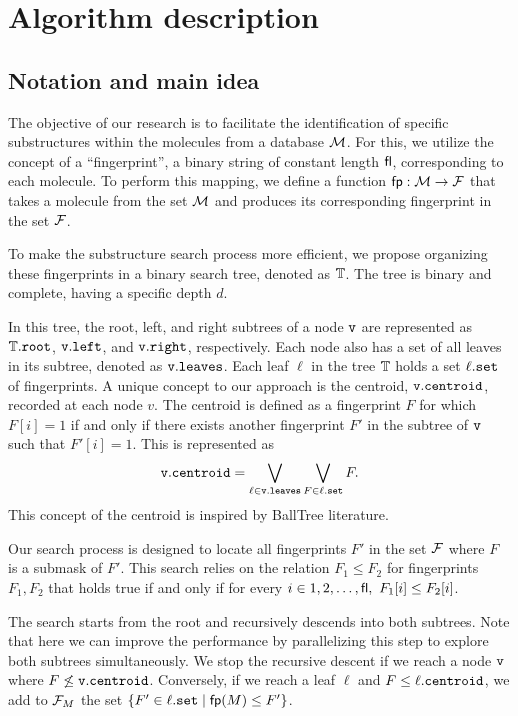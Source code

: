 \section{Algorithm description}

\subsection{Notation and main idea}
The objective of our research is to facilitate the identification of specific substructures within the molecules from a database $\mathcal{M}$. 
For this, we utilize the concept of a ``fingerprint'', a binary string of constant length ${\sf fl}$, corresponding to each molecule. 
To perform this mapping, we define a function ${\sf fp}: \mathcal{M} \to \mathcal{F}$ that takes a molecule from the set $\mathcal{M}$ and produces its 
corresponding fingerprint in the set $\mathcal{F}$. 

To make the substructure search process more efficient, we propose organizing these fingerprints in a binary search tree, denoted as $\mathbb{T}$. 
The tree is binary and complete, having a specific depth $d$.

In this tree, the root, left, and right subtrees of a node $\tt{v}$ are represented as $\mathbb{T}.\tt{root}$, $\tt{v.left}$, and $\tt{v.right}$, 
respectively. Each node also has a set of all leaves in its subtree, denoted as $\tt{v.leaves}$. Each leaf $\ell$ in the tree $\mathbb{T}$ holds 
a set $\ell.\tt{set}$ of fingerprints. A unique concept to our approach is the centroid, ${\tt v.centroid}$, recorded at each node $v$. 
The centroid is defined as a fingerprint $F$ for which $F[i] = 1$ if and only if there exists another fingerprint $F'$ in the subtree 
of $\tt{v}$ such that $F'[i] = 1$. This is represented as
$${\tt v.centroid} = \bigvee\limits_{\ell \in {\tt v.leaves}}\bigvee\limits_{F \in \ell.{\tt set}} F.$$ 
This concept of the centroid is inspired by BallTree literature.

Our search process is designed to locate all fingerprints $F'$ in the set $\mathcal{F}$ where $F$ is a submask of $F'$. This search relies on the relation $F_1 \le F_2$ for fingerprints $F_1, F_2$ that holds true if and only if for every $i \in {1, 2, \ldots, {\sf fl}}, \ F_1[i] \le F_2[i]$. 

The search starts from the root and recursively descends into both subtrees. Note that here we can improve the performance by parallelizing 
this step to explore both subtrees simultaneously. We stop the recursive descent if we reach a node ${\tt v}$ where $F \not\le {\tt v.centroid}$. 
Conversely, if we reach a leaf $\ell$ and $F \le \ell.{\tt centroid}$, we add to $\mathcal{F}_M$ the set $\{F' \in  \ell.{\tt set} \mid {\sf fp}(M) \le F'\}$.

